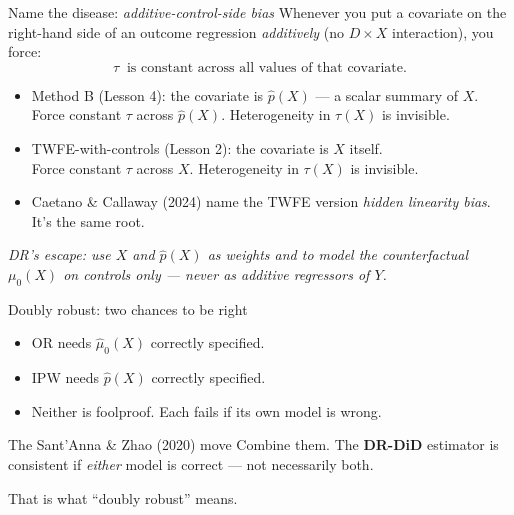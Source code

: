 \documentclass[aspectratio=169,11pt]{beamer}
\begin{document}
\begin{frame}{Name the disease: \textit{additive-control-side bias}}
\vspace{0.4em}
Whenever you put a covariate on the right-hand side of an outcome regression \textit{additively} (no $D \times X$ interaction), you force:
\vspace{-0.2em}
\[
\tau \;\;\text{is constant across all values of that covariate.}
\]
\vspace{-0.4em}
\begin{itemize}\small
  \item Method B (Lesson 4): the covariate is $\widehat{p}(X)$ --- a scalar summary of $X$. \\
        Force constant $\tau$ across $\widehat{p}(X)$. Heterogeneity in $\tau(X)$ is invisible.
  \item TWFE-with-controls (Lesson 2): the covariate is $X$ itself. \\
        Force constant $\tau$ across $X$. Heterogeneity in $\tau(X)$ is invisible.
  \item {} Caetano \& Callaway (2024) name the TWFE version \textit{hidden linearity bias}. It's the same root.
\end{itemize}
\vspace{0.3em}
\begin{center}
\small\color{warmgray}\itshape
DR's escape: use $X$ and $\widehat{p}(X)$ as \textit{weights} and to model the \textit{counterfactual} $\mu_0(X)$ on controls only --- never as additive regressors of $Y$.
\end{center}
\end{frame}


\begin{frame}{Doubly robust: two chances to be right}
\vspace{0.4em}
\begin{itemize}
  \item OR needs $\widehat{\mu}_0(X)$ correctly specified.
  \item IPW needs $\widehat{p}(X)$ correctly specified.
  \item Neither is foolproof. Each fails if its own model is wrong.
\end{itemize}
\vspace{0.5em}
\begin{block}{The Sant'Anna \& Zhao (2020) move}
\small
Combine them. The \textbf{DR-DiD} estimator is consistent if \textit{either} model is correct --- not necessarily both.
\end{block}
\vspace{0.4em}
 \;\; That is what ``doubly robust'' means.
\end{frame}
\end{document}

